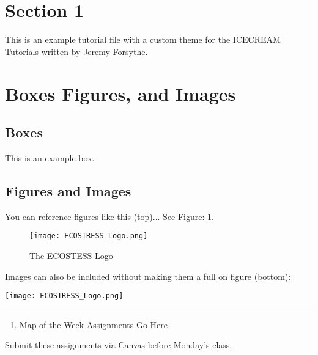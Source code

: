 \documentclass[oneside,a4paper,11pt,explicit]{book}
\begin{document}
	\vspace{1 em}

\section{Section 1}

This is an example tutorial file with a custom theme for the ICECREAM Tutorials written by \href{https://www.jeremyforsythe.dev/}{Jeremy Forsythe}.

\section{Boxes Figures, and Images}

\subsection{Boxes}


\begin{tcolorbox}[colback=yellow!5!white,colframe=IceCreamLeaf,title=\textbf{Box Title}]
	This is an example box.
\end{tcolorbox}

\subsection{Figures and Images}

You can reference figures like this (top)... See Figure: \ref{fig:ECOSTRESS_Logo}.

\begin{figure}[h]
    \centering
    \texttt{[image: ECOSTRESS\_Logo.png]}
    \caption{The ECOSTESS Logo}
    \label{fig:ECOSTRESS_Logo}
\end{figure}

Images can also be included without making them a full on figure (bottom):

\centerline{\texttt{[image: ECOSTRESS\_Logo.png]}}

\vspace{.25em}

\hrule

\vspace{1 em}

\begin{tcolorbox}[colback=yellow!5!white,colframe=IceCreamOrbit,title= \vspace{.2em} \Large Map of the Week Assignments]
	\large
	\begin{enumerate}
		\item Map of the Week Assignments Go Here
	\end{enumerate}	
	Submit these assignments via Canvas before Monday's class.
\end{tcolorbox}
\end{document}
